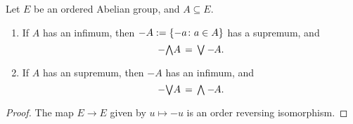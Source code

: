 \documentclass[main.tex]{subfiles}
\begin{document}
%
%
\begin{lem}
\label{L:oag-minus-preserves}
Let $E$ be an ordered Abelian group,
and $A\subseteq E$.
\begin{enumerate}
\item
If $A$ has an infimum,
then $-A:= \{-a\colon a\in A\}$
has a supremum,
and 
\begin{equation*}
-\textstyle{\bigwedge} A \,=\, \textstyle{\bigvee} -\hspace{-3pt}A.
\end{equation*}
\item
If $A$ has an supremum,
then $-A$
has an infimum, and
\begin{equation*}
-\textstyle{\bigvee} A \,=\, \textstyle{\bigwedge} -\hspace{-3pt}A.
\end{equation*}
\end{enumerate}
\end{lem}
\begin{proof}
The map $E\rightarrow E$ given by
$u\mapsto -u$ is an order reversing isomorphism.
\end{proof}
\end{document}
